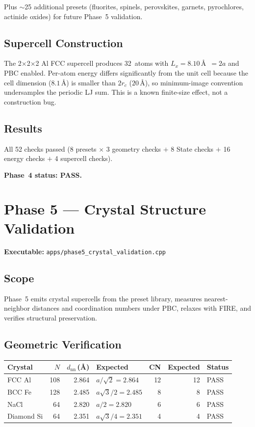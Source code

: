 \documentclass[11pt]{article}
\begin{document}
Plus $\sim$25 additional presets (fluorites, spinels, perovskites,
garnets, pyrochlores, actinide oxides) for future Phase~5 validation.

\subsection{Supercell Construction}

The 2$\times$2$\times$2 Al FCC supercell produces 32~atoms with
$L_x = 8.10$\,\AA\ $= 2a$ and PBC enabled.  Per-atom energy differs
significantly from the unit cell because the cell dimension
($8.1$\,\AA) is smaller than $2 r_c$ ($20$\,\AA), so minimum-image
convention undersamples the periodic LJ sum.  This is a known
finite-size effect, not a construction bug.

\subsection{Results}

All 52 checks passed (8 presets $\times$ 3 geometry checks $+$ 8 State
checks $+$ 16 energy checks $+$ 4 supercell checks).

\textbf{Phase~4 status: PASS.}

\section{Phase 5 --- Crystal Structure Validation}

\textbf{Executable:} \texttt{apps/phase5\_crystal\_validation.cpp}

\subsection{Scope}

Phase~5 emits crystal supercells from the preset library, measures
nearest-neighbor distances and coordination numbers under PBC, relaxes
with FIRE, and verifies structural preservation.

\subsection{Geometric Verification}

\begin{center}
\begin{tabular}{lrrlrrl}
\toprule
Crystal & $N$ & $d_{\mathrm{nn}}$\,(\AA) & Expected & CN & Expected & Status \\
\midrule
FCC Al  & 108 & 2.864 & $a/\!\sqrt{2}=2.864$ & 12 & 12 & PASS \\
BCC Fe  & 128 & 2.485 & $a\sqrt{3}/2=2.485$  &  8 &  8 & PASS \\
NaCl    &  64 & 2.820 & $a/2=2.820$          &  6 &  6 & PASS \\
Diamond Si & 64 & 2.351 & $a\sqrt{3}/4=2.351$ & 4 & 4 & PASS \\
\bottomrule
\end{tabular}
\end{center}
\end{document}
